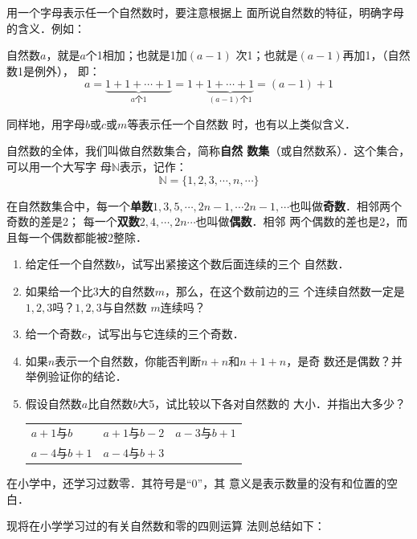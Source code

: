     用一个字母表示任一个自然数时，要注意根据上
    面所说自然数的特征，明确字母的含义．例如：

    自然数$a$，就是$a$个1相加；也就是1加$(a- 1)$
次1；也就是$(a-1)$再加1，（自然数1是例外），
即：
\[a=\underbrace{1+1+\cdots+1}_{a\text{个} 1}=1+\underbrace{1+\cdots+1}_{(a-1)\text{个} 1} = (a-1)+1\]

同样地，用字母$b$或$c$或$m$等表示任一个自然数
时，也有以上类似含义．

    自然数的全体，我们叫做自然数集合，简称\textbf{自然
数集}（或自然数系）．这个集合，可以用一个大写字
母$\mathbb{N}$表示，记作：
\[\mathbb{N}=\{1,2,3,\cdots,n,\cdots \} \]

在自然数集合中，每一个\textbf{单数}$1, 3, 5,\cdots, 2n-1,\cdots 2n-1,\cdots$也叫做\textbf{奇数}．相邻两个奇数的差是2；
每一个\textbf{双数}$2 ,  4 , \cdots,  2n\cdots$也叫做\textbf{偶数}．相邻
两个偶数的差也是2，而且每一个偶数都能被2整除．

\begin{ex}
\begin{enumerate}
    \item  给定任一个自然数$b$，试写出紧接这个数后面连续的三个
      自然数．
      \item  如果给一个比3大的自然数$m$，那么，在这个数前边的三
      个连续自然数一定是$1,  2,  3$吗？$1,  2,  3$与自然数
      $m$连续吗？
      \item  给一个奇数$c$，试写出与它连续的三个奇数．
      \item  如果$n$表示一个自然数，你能否判断$n+n$和$n+1+n$，是奇
      数还是偶数？并举例验证你的结论．
      \item 假设自然数$a$比自然数$b$大5，试比较以下各对自然数的
        大小．并指出大多少？
\begin{center}
    \begin{tabular}{lll}
    $a+1$与$b$&
    $a + 1$与$b-2$&
    $a-3$与$b + 1$\\
    $a-4$与$b+1$&
    $a-4$与$b+ 3$\\
\end{tabular}
\end{center}

    \end{enumerate}  
\end{ex}

在小学中，还学习过数零．其符号是“0”，其
意义是表示数量的没有和位置的空白．

    现将在小学学习过的有关自然数和零的四则运算
法则总结如下：

